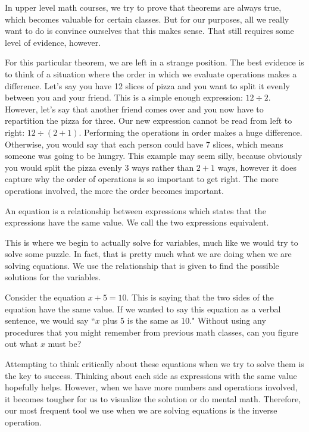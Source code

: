 \noindent
In upper level math courses, we try to prove that theorems are always true, which becomes valuable for certain classes. But for our purposes, all we really want to do is convince ourselves that this makes sense. That still requires some level of evidence, however. 

For this particular theorem, we are left in a strange position. The best evidence is to think of a situation where the order in which we evaluate operations makes a difference. Let's say you have 12 slices of pizza and you want to split it evenly between you and your friend. This is a simple enough expression: $12 \div 2$. However, let's say that another friend comes over and you now have to repartition the pizza for three. Our new expression cannot be read from left to right: $12 \div (2+1)$. Performing the operations in order makes a huge difference. Otherwise, you would say that each person could have 7 slices, which means someone was going to be hungry. This example may seem silly, because obviously you would split the pizza evenly 3 ways rather than $2+1$ ways, however it does capture why the order of operations is so important to get right. The more operations involved, the more the order becomes important. 

\begin{defn}[Equation]
An equation is a relationship between expressions which states that the expressions have the same value. We call the two expressions equivalent. 	
\end{defn}

This is where we begin to actually solve for variables, much like we would try to solve some puzzle. In fact, that is pretty much what we are doing when we are solving equations. We use the relationship that is given to find the possible solutions for the variables. 

\begin{example}
Consider the equation $x+5=10$. This is saying that the two sides of the equation have the same value. If we wanted to say this equation as a verbal sentence, we would say ``$x$ plus 5 is the same as 10." Without using any procedures that you might remember from previous math classes, can you figure out what $x$ must be? 
\end{example}

Attempting to think critically about these equations when we try to solve them is the key to success. Thinking about each side as expressions with the same value hopefully helps. However, when we have more numbers and operations involved, it becomes tougher for us to visualize the solution or do mental math. Therefore, our most frequent tool we use when we are solving equations is the inverse operation.

